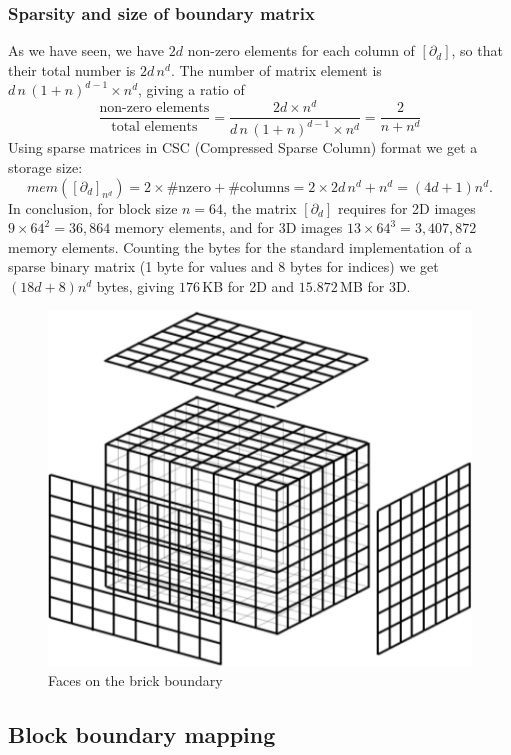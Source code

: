 \subsubsection*{Sparsity and size of boundary matrix }\label{sec:bm-size}

As we have seen, we have $2d$ non-zero elements for each column of $[\partial_d]$, so that their total number is $2d\,n^d$. The number of matrix element is $d\,n\,(1+n)^{d-1} \times n^d$, giving a ratio of 
\[
\frac{\mbox{non-zero\ elements}}{\mbox{total\ elements}} = 
\frac{2d\times n^d}{d\,n\,(1+n)^{d-1} \times n^d} =
\frac{2}{n+n^d}
\]
Using sparse matrices in CSC (Compressed Sparse Column) format we get a storage size:
\[
mem([\partial_d]_{n^d}) = 2\times \#\mbox{nzero} + \#\mbox{columns} = 2\times 2d\,n^d + n^d = (4d+1)n^d.
\]
In conclusion, for block size $n=64$, the matrix $[\partial_d]$ requires for 2D images $9\times 64^2=36,864$ memory elements, and for 3D images $13\times 64^3=3,407,872$ memory elements. Counting the bytes for the standard implementation of a sparse binary matrix (1 byte for values and 8 bytes for indices) we get $(18d+8)n^d$ bytes, giving $176$\,KB for 2D and $15.872$\,MB for 3D.


\begin{figure}[htbp] %
   \centering
   \includegraphics[width=0.4\linewidth]{figs/grid.pdf} 
   \caption{Faces on the brick boundary}
   \label{fig:blockboundary}
\end{figure}



\subsection{Block boundary mapping}\label{sec:block-mapping}


